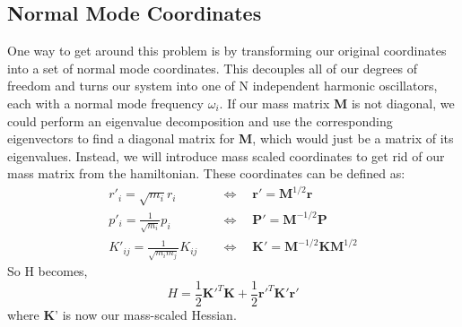 \documentclass{article}
\newcommand{\be}{\begin{equation}}
\newcommand{\ee}{\end{equation}}
\newcommand{\br}{\textbf{r}}
\newcommand{\bp}{\textbf{P}}
\newcommand{\bm}{\textbf{M}}
\newcommand{\bk}{\textbf{K}}
\begin{document}
\subsection{Normal Mode Coordinates}
One way to get around this problem is by transforming our original coordinates into a set of normal mode coordinates.
This decouples all of our degrees of freedom and turns our system into one of N independent harmonic oscillators, each with a normal mode frequency $\omega_i$.
If our mass matrix \textbf{M} is not diagonal, we could perform an eigenvalue decomposition and use the corresponding eigenvectors to find a diagonal matrix for \bm, which would just be a matrix of its eigenvalues.
Instead, we will introduce mass scaled coordinates to get rid of our mass matrix from the hamiltonian.
These coordinates can be defined as:
\be
  \begin{split}
    r'_i = \sqrt{m_i} r_i \quad &\Longleftrightarrow \quad \br' = \bm^{1/2} \br \\
    p'_i = \frac{1}{\sqrt{m_i}} p_i \quad &\Longleftrightarrow \quad \bp' = \bm^{-1/2} \bp \\
    K'_{i j} = \frac{1}{\sqrt{m_i m_j}} K_{i j} \quad &\Longleftrightarrow \quad \bk' = \bm^{-1/2} \bk \bm^{1/2}
  \end{split}
\ee
So H becomes,
\be
  H = \frac{1}{2} \bk'^T \bk + \frac{1}{2} \br'^T \bk' \br'
\ee
where \bk' is now our mass-scaled Hessian.

\subsection{}
\end{document}
